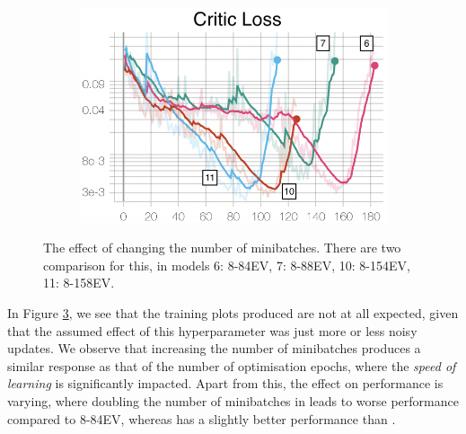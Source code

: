 \begin{figure}[hbt]
\begin{subfigure}[b]{0.32\textwidth}
         \caption{}
         \label{fig:5_training_ppo_nminibatchActorL}
     \end{subfigure}
     \hfill
     \begin{subfigure}[b]{0.32\textwidth}
         \centering
         \includegraphics[width=\textwidth]{figures/5_/Training/ppo_nminibatchCriticL.png}
         \caption{}
         \label{fig:5_training_ppo_nminibatchCriticL}
     \end{subfigure}
    \captionsetup{justification=centering}
    \caption{The effect of changing the number of minibatches. There are two comparison for this, in models 6: 8-84EV, 7: 8-88EV, 10: 8-154EV, 11: 8-158EV.}
     \label{fig:5_training_ppo_nminibatch}
\end{figure}
In Figure \ref{fig:5_training_ppo_nminibatch}, we see that the training plots produced are not at all expected, given that the assumed effect of this hyperparameter was just more or less noisy updates. We observe that increasing the number of minibatches produces a similar response as that of the number of optimisation epochs, where the \textit{speed of learning} is significantly impacted. Apart from this, the effect on performance is varying, where doubling the number of minibatches in \seven leads to worse performance compared to 8-84EV, whereas \eleven has a slightly better performance than \ten. 

